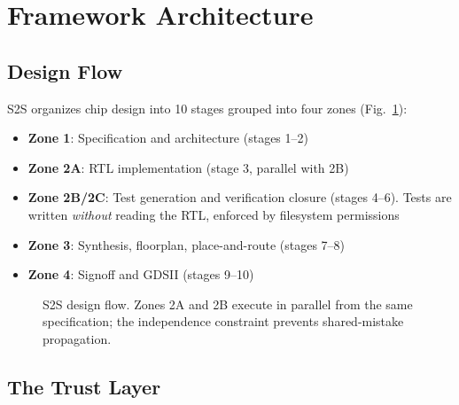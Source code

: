 \documentclass[journal]{IEEEtran}
\begin{document}
\section{Framework Architecture}
\label{sec:architecture}

\subsection{Design Flow}

S2S organizes chip design into 10 stages grouped into four zones (Fig.~\ref{fig:flow}):

\begin{itemize}
    \item \textbf{Zone 1}: Specification and architecture (stages 1--2)
    \item \textbf{Zone 2A}: RTL implementation (stage 3, parallel with 2B)
    \item \textbf{Zone 2B/2C}: Test generation and verification closure (stages 4--6). Tests are written \emph{without} reading the RTL, enforced by filesystem permissions
    \item \textbf{Zone 3}: Synthesis, floorplan, place-and-route (stages 7--8)
    \item \textbf{Zone 4}: Signoff and GDSII (stages 9--10)
\end{itemize}

\begin{figure}[t]
\centering
{}
\caption{S2S design flow. Zones 2A and 2B execute in parallel from the same specification; the independence constraint prevents shared-mistake propagation.}
\label{fig:flow}
\end{figure}

\subsection{The Trust Layer}
\end{document}

